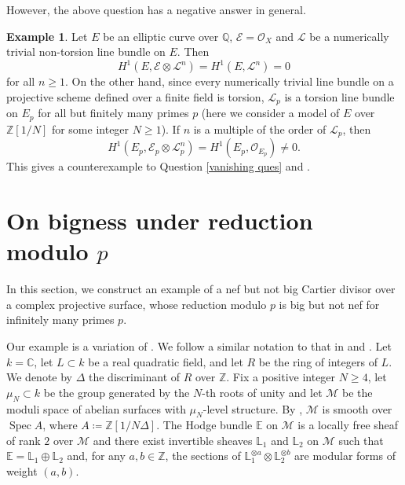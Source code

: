 \documentclass[12pt]{amsart}
\def\ge{\geqslant}
\def\Spec{\operatorname{Spec}}
\newcommand{\Q}{\mathbb{Q}}
\newcommand{\Z}{\mathbb{Z}}
\newcommand{\sO}{\mathcal{O}}
\theoremstyle{plain}
\theoremstyle{definition}
\newtheorem{eg}[thm]{Example}
\theoremstyle{remark}
\newtheorem{defn and notation}[thm]{Definition and Notation}
\theoremstyle{plain}
\begin{document}
However, the above question has a negative answer in general. 

\begin{eg}\label{counterexample}
Let $E$ be an elliptic curve over $\Q$, $\mathcal{E}=\sO_X$ and $\mathcal{L}$ be a numerically trivial non-torsion line bundle on $E$. Then 
\[
H^1(E, \mathcal{E}\otimes \mathcal{L}^n)=H^1(E, \mathcal{L}^n)=0    
\]
for all $n \ge 1$. 
On the other hand, since every numerically trivial line bundle on a projective scheme defined over a finite field is torsion, $\mathcal{L}_p$ is a torsion line bundle on $E_p$ for all but finitely many primes $p$ (here we consider a model of $E$ over $\Z[1/N]$ for some integer $N \ge 1$). 
If $n$ is a multiple of the order of $\mathcal{L}_p$, then 
\[H^1(E_p, \mathcal{E}_p\otimes \mathcal{L}_p^n)=H^1(E_p, \sO_{E_p}) \ne 0.\]
This gives a counterexample to Question \ref{vanishing ques} and \cite[Corollary 2.16]{Schoutens05}. 
\end{eg}


\section{On bigness under reduction modulo $p$}\label{big example}
In this section, we construct an example of a nef but not big Cartier divisor over a complex projective surface, whose reduction modulo $p$ is big but not nef for infinitely many primes $p$. 

Our example is a variation of \cite[Remark 3, pag. 3]{yang}. We follow a similar notation to that in \cite{DP} and \cite{AG}. Let $k=\mathbb C$, let $L\subset k$ be a real quadratic field, and let $R$ be the ring of integers of $L$. We denote by $\Delta$ the discriminant of $R$ over $\mathbb Z$. Fix a positive integer $N\ge 4$, let $\mu_N\subset k$ be the group generated by the $N$-th roots of  unity and let $\mathcal M$ be the moduli space of abelian surfaces with $\mu_N$-level structure. By \cite[Theorem 2.2]{DP},  $\mathcal M$ is smooth over $\Spec A$, where $A\coloneqq \mathbb Z[1/N\Delta]$. 
The Hodge bundle $\mathbb E$ on $\mathcal M$ is a locally free sheaf of rank $2$ over $\mathcal M$ \cite[\S 4.1]{AG} and there exist invertible sheaves $\mathbb L_1$ and $\mathbb L_2$ on $\mathcal M$ such that $\mathbb  E=\mathbb L_1\oplus \mathbb L_2$ and, for any $a,b\in \mathbb Z$, the sections of $\mathbb L_1^{\otimes a}\otimes \mathbb L_2^{\otimes b}$ are modular forms of weight $(a,b)$.
\end{document}
